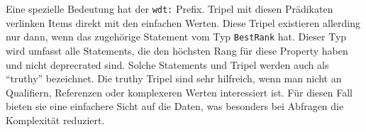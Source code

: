 Eine spezielle Bedeutung hat der \verb|wdt:| Prefix.
Tripel mit diesen Prädikaten verlinken Items direkt mit den einfachen Werten.
Diese Tripel existieren allerding nur dann, wenn das zugehörige Statement vom Typ \verb|BestRank| hat.
Dieser Typ wird umfasst alle Statements, die den höchsten Rang für diese Property haben und nicht deprecrated sind.
Solche Statements und Tripel werden auch als ``truthy'' bezeichnet.
Die truthy Tripel sind sehr hilfreich, wenn man nicht an Qualifiern, Referenzen oder komplexeren Werten interessiert ist.
Für diesen Fall bieten sie eine einfachere Sicht auf die Daten, was besonders bei Abfragen die Komplexität reduziert.
